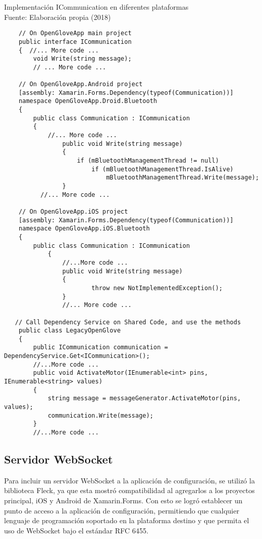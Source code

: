 \begin{algorithm}[!ht]
  \begin{center}
   	\captionsetup{justification=centering}
    \caption[Implementación ICommunication en diferentes plataformas]{Implementación ICommunication en diferentes plataformas
    \\ \tab[4cm] Fuente: Elaboración propia (2018)}
    \label{code:implementation-csharp-ll}
  \end{center}
  \begin{lstlisting}
	// On OpenGloveApp main project
    public interface ICommunication
    {  //... More code ...
        void Write(string message);
        // ... More code ...
    
    // On OpenGloveApp.Android project
    [assembly: Xamarin.Forms.Dependency(typeof(Communication))]
	namespace OpenGloveApp.Droid.Bluetooth
	{
	    public class Communication : ICommunication
	    {
       	 	//... More code ...
	    		public void Write(string message)
        		{
            		if (mBluetoothManagementThread != null)
                		if (mBluetoothManagementThread.IsAlive)
                    		mBluetoothManagementThread.Write(message);
        		}		
       	  //... More code ...
       	  
    // On OpenGloveApp.iOS project
    [assembly: Xamarin.Forms.Dependency(typeof(Communication))]
	namespace OpenGloveApp.iOS.Bluetooth
	{
		public class Communication : ICommunication
    		{
        		//...More code ...
        		public void Write(string message)
	        	{
    	        		throw new NotImplementedException();
        		}
        		//... More code ...

   // Call Dependency Service on Shared Code, and use the methods
    public class LegacyOpenGlove
    {
        public ICommunication communication = DependencyService.Get<ICommunication>();        
        //...More code ...
        public void ActivateMotor(IEnumerable<int> pins, IEnumerable<string> values)
        {
            string message = messageGenerator.ActivateMotor(pins, values);
            communication.Write(message);
        }
        //...More code ...
\end{lstlisting}
\end{algorithm}


\subsection{Servidor WebSocket}
Para incluir un servidor WebSocket a la aplicación de configuración, se utilizó la biblioteca Fleck, ya que esta mostró compatibilidad al agregarlos a los proyectos principal, iOS y Android de Xamarin.Forms. Con esto se logró establecer un punto de acceso a la aplicación de configuración, permitiendo que cualquier lenguaje de programación soportado en la plataforma destino y que permita el uso de WebSocket bajo el estándar RFC 6455.



